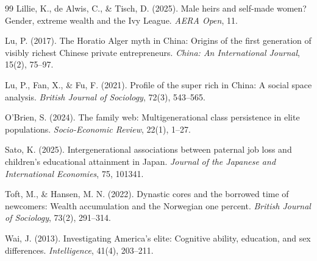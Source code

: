 \documentclass[UTF8,a4paper,11pt]{ctexart}
\begin{document}
\begin{thebibliography}{99}
 Lillie, K., de Alwis, C., \& Tisch, D. (2025). Male heirs and self-made women? Gender, extreme wealth and the Ivy League. \emph{AERA Open}, 11.

 Lu, P. (2017). The Horatio Alger myth in China: Origins of the first generation of visibly richest Chinese private entrepreneurs. \emph{China: An International Journal}, 15(2), 75--97.

 Lu, P., Fan, X., \& Fu, F. (2021). Profile of the super rich in China: A social space analysis. \emph{British Journal of Sociology}, 72(3), 543--565.

 O'Brien, S. (2024). The family web: Multigenerational class persistence in elite populations. \emph{Socio-Economic Review}, 22(1), 1--27.

 Sato, K. (2025). Intergenerational associations between paternal job loss and children's educational attainment in Japan. \emph{Journal of the Japanese and International Economies}, 75, 101341.

 Toft, M., \& Hansen, M. N. (2022). Dynastic cores and the borrowed time of newcomers: Wealth accumulation and the Norwegian one percent. \emph{British Journal of Sociology}, 73(2), 291--314.

 Wai, J. (2013). Investigating America's elite: Cognitive ability, education, and sex differences. \emph{Intelligence}, 41(4), 203--211.

\end{thebibliography}
\end{document}
